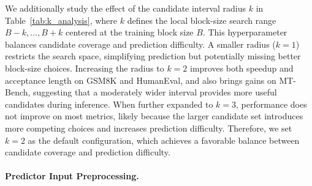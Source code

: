 \documentclass{article}
\begin{document}
We additionally study the effect of the candidate interval radius $k$ in Table~\ref{tab:k_analysis}, where $k$ defines the local block-size search range ${B-k,\ldots,B+k}$ centered at the training block size $B$. This hyperparameter balances candidate coverage and prediction difficulty. A smaller radius ($k=1$) restricts the search space, simplifying prediction but potentially missing better block-size choices. Increasing the radius to $k=2$ improves both speedup and acceptance length on GSM8K and HumanEval, and also brings gains on MT-Bench, suggesting that a moderately wider interval provides more useful candidates during inference. When further expanded to $k=3$, performance does not improve on most metrics, likely because the larger candidate set introduces more competing choices and increases prediction difficulty. Therefore, we set $k=2$ as the default configuration, which achieves a favorable balance between candidate coverage and prediction difficulty.






\paragraph{Predictor Input Preprocessing.}

\begin{table}
\vspace{-10pt}
\centering
\scriptsize
\setlength{\tabcolsep}{4.0pt}
\renewcommand{\arraystretch}{1.05}
\caption{Effect of predictor input preprocessing on speedup and acceptance length ($\tau$).}
\label{tab:input_preprocessing}
\vspace{-10pt}
\end{table}
\end{document}
